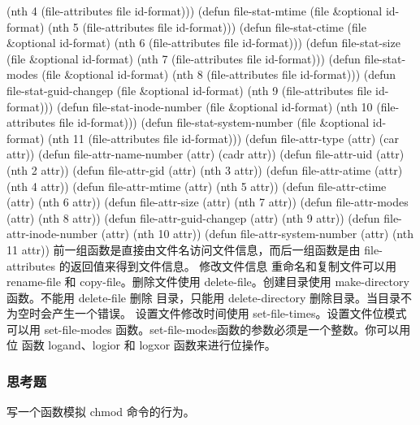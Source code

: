 \documentclass[11pt]{ctexart}
\begin{document}
{{{{(nth 4 (file-attributes file id-format)))
(defun file-stat-mtime (file \&optional id-format)
(nth 5 (file-attributes file id-format)))
(defun file-stat-ctime (file \&optional id-format)
(nth 6 (file-attributes file id-format)))
(defun file-stat-size (file \&optional id-format)
(nth 7 (file-attributes file id-format)))
(defun file-stat-modes (file \&optional id-format)
(nth 8 (file-attributes file id-format)))
(defun file-stat-guid-changep (file \&optional id-format)
(nth 9 (file-attributes file id-format)))
(defun file-stat-inode-number (file \&optional id-format)
(nth 10 (file-attributes file id-format)))
(defun file-stat-system-number (file \&optional id-format)
(nth 11 (file-attributes file id-format)))
(defun file-attr-type (attr)
(car attr))
(defun file-attr-name-number (attr)
(cadr attr))
(defun file-attr-uid (attr)
(nth 2 attr))
(defun file-attr-gid (attr)
(nth 3 attr))
(defun file-attr-atime (attr)
(nth 4 attr))
(defun file-attr-mtime (attr)
(nth 5 attr))
(defun file-attr-ctime (attr)
(nth 6 attr))
(defun file-attr-size (attr)
(nth 7 attr))
(defun file-attr-modes (attr)
(nth 8 attr))
(defun file-attr-guid-changep (attr)
(nth 9 attr))
(defun file-attr-inode-number (attr)
(nth 10 attr))
(defun file-attr-system-number (attr)
(nth 11 attr))
前一组函数是直接由文件名访问文件信息，而后一组函数是由 file-attributes 的返回值来得到文件信息。
修改文件信息
重命名和复制文件可以用 rename-file 和 copy-file。删除文件使用 delete-file。创建目录使用 make-directory 函数。不能用 delete-file 删除 目录，只能用 delete-directory 删除目录。当目录不为空时会产生一个错误。
设置文件修改时间使用 set-file-times。设置文件位模式可以用 set-file-modes 函数。set-file-modes函数的参数必须是一个整数。你可以用位 函数 logand、logior 和 logxor 函数来进行位操作。
\subsubsection{思考题}
\label{sec:org73cf5e0}
写一个函数模拟 chmod 命令的行为。
}}}}
\end{document}
